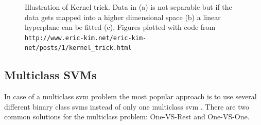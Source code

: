 \begin{figure}
	\centering
	\caption{Illustration of Kernel trick. Data in {(a)} is not separable but if the data gets mapped into a higher dimensional space {(b)} a linear hyperplane can be fitted {(c)}. Figures plotted with code from \texttt{http://www.eric-kim.net/eric-kim-net/posts/1/kernel\_trick.html}}
	\label{fig:svmKernelTrick}
\end{figure}

\subsection*{Multiclass SVMs}
\label{subsec:svmMulticlass}
In case of a multiclass \gls{svm} problem the most popular approach is to use several different binary class \glspl{svm} instead of only one multiclass \gls{svm} \cite{Hsu2002, Duan2005, Thome2012}. There are two common solutions for the multiclass problem: One-VS-Rest and One-VS-One.

